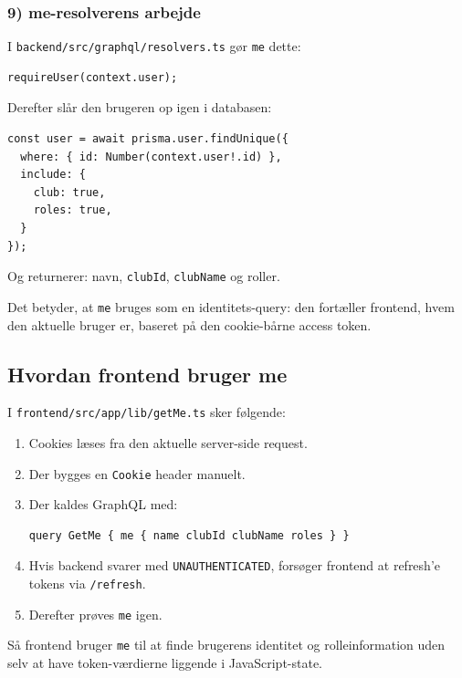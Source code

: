 \subsubsection{9) me-resolverens arbejde}
I \texttt{backend/src/graphql/resolvers.ts} gør \texttt{me} dette:
\begin{verbatim}
requireUser(context.user);
\end{verbatim}
Derefter slår den brugeren op igen i databasen:
\begin{verbatim}
const user = await prisma.user.findUnique({
  where: { id: Number(context.user!.id) },
  include: {
    club: true,
    roles: true,
  }
});
\end{verbatim}
Og returnerer: navn, \texttt{clubId}, \texttt{clubName} og roller.

Det betyder, at \texttt{me} bruges som en identitets-query: den fortæller frontend, hvem den aktuelle bruger er, baseret på den cookie-bårne access token.

\subsection{Hvordan frontend bruger me}
I \texttt{frontend/src/app/lib/getMe.ts} sker følgende:
\begin{enumerate}
    \item Cookies læses fra den aktuelle server-side request.
    \item Der bygges en \texttt{Cookie} header manuelt.
    \item Der kaldes GraphQL med:
\begin{verbatim}
query GetMe { me { name clubId clubName roles } }
\end{verbatim}
    \item Hvis backend svarer med \texttt{UNAUTHENTICATED}, forsøger frontend at refresh'e tokens via \texttt{/refresh}.
    \item Derefter prøves \texttt{me} igen.
\end{enumerate}
Så frontend bruger \texttt{me} til at finde brugerens identitet og rolleinformation uden selv at have token-værdierne liggende i JavaScript-state.